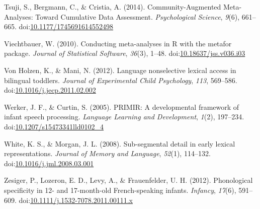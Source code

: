 \documentclass[man]{apa6}
\theoremstyle{definition}
\theoremstyle{definition}
\theoremstyle{definition}
\theoremstyle{remark}
\begin{document}
\hypertarget{ref-Tsuji2014}{}
Tsuji, S., Bergmann, C., \& Cristia, A. (2014). Community-Augmented
Meta-Analyses: Toward Cumulative Data Assessment. \emph{Psychological
Science}, \emph{9}(6), 661--665.
doi:\href{https://doi.org/10.1177/1745691614552498}{10.1177/1745691614552498}

\hypertarget{ref-metafor}{}
Viechtbauer, W. (2010). Conducting meta-analyses in R with the metafor
package. \emph{Journal of Statistical Software}, \emph{36}(3), 1--48.
doi:\href{https://doi.org/10.18637/jss.v036.i03}{10.18637/jss.v036.i03}

\hypertarget{ref-VonHolzen2012}{}
Von Holzen, K., \& Mani, N. (2012). Language nonselective lexical access
in bilingual toddlers. \emph{Journal of Experimental Child Psychology},
\emph{113}, 569--586.
doi:\href{https://doi.org/10.1016/j.jecp.2011.02.002}{10.1016/j.jecp.2011.02.002}

\hypertarget{ref-Werker2005}{}
Werker, J. F., \& Curtin, S. (2005). PRIMIR: A developmental framework
of infant speech processing. \emph{Language Learning and Development},
\emph{1}(2), 197--234.
doi:\href{https://doi.org/10.1207/s15473341lld0102_4}{10.1207/s15473341lld0102\_4}

\hypertarget{ref-White2008}{}
White, K. S., \& Morgan, J. L. (2008). Sub-segmental detail in early
lexical representations. \emph{Journal of Memory and Language},
\emph{52}(1), 114--132.
doi:\href{https://doi.org/10.1016/j.jml.2008.03.001}{10.1016/j.jml.2008.03.001}

\hypertarget{ref-Zesiger2012}{}
Zesiger, P., Lozeron, E. D., Levy, A., \& Frauenfelder, U. H. (2012).
Phonological specificity in 12- and 17-month-old French-speaking
infants. \emph{Infancy}, \emph{17}(6), 591--609.
doi:\href{https://doi.org/10.1111/j.1532-7078.2011.00111.x}{10.1111/j.1532-7078.2011.00111.x}

\endgroup
\end{document}
